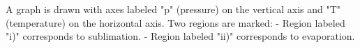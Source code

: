 A graph is drawn with axes labeled "p" (pressure) on the vertical axis and "T" (temperature) on the horizontal axis. Two regions are marked:  
- Region labeled "i)" corresponds to sublimation.  
- Region labeled "ii)" corresponds to evaporation.